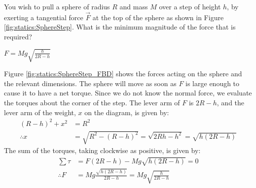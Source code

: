 \question You wish to pull a sphere of radius $R$ and mass $M$ over a step of height $h$, by exerting a tangential force $\vec F$ at the top of the sphere as shown in Figure \ref{fig:statics:SphereStep}. What is the minimum magnitude of the force that is required?
\begin{finalanswer}
$F=Mg\sqrt{\frac{h}{2R-h}}$
\end{finalanswer}
\begin{solution}
Figure \ref{fig:statics:SphereStep_FBD} shows the forces acting on the sphere and the relevant dimensions. The sphere will move as soon as $F$ is large enough to cause it to have a net torque. 
Since we do not know the normal force, we evaluate the torques about the corner of the step. The lever arm of $F$ is $2R-h$, and the lever arm of the weight, $x$ on the diagram, is given by:
\begin{align*}
(R-h)^2+x^2&=R^2\\
\therefore x&=\sqrt{R^2-(R-h)^2}=\sqrt{2Rh-h^2}=\sqrt{h(2R-h)}
\end{align*}
The sum of the torques, taking clockwise as positive, is given by:
\begin{align*}
\sum \tau &= F(2R-h)-Mg\sqrt{h(2R-h)}=0\\
\therefore F&=Mg\frac{\sqrt{h(2R-h)}}{2R-h}=Mg\sqrt{\frac{h}{2R-h}}
\end{align*}

\end{solution}

